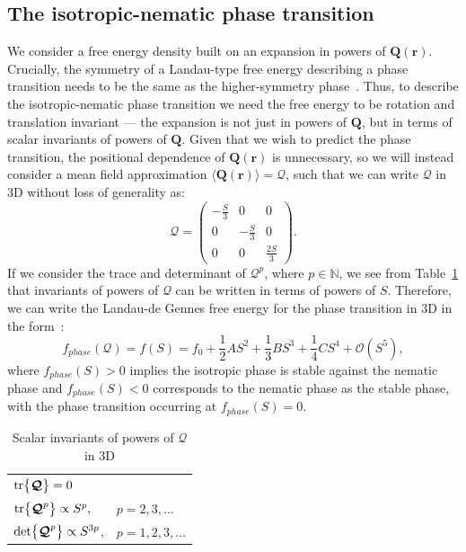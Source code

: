 \subsection{The isotropic-nematic phase transition}
We consider a free energy density built on an expansion in powers of $\mathbf{Q}(\mathbf{r})$.
Crucially, the symmetry of a Landau-type free energy describing a phase transition needs to be the same as the higher-symmetry phase~\cite{RN33,RN175}.
Thus, to describe the isotropic-nematic phase transition we need the free energy to be rotation and translation invariant --- the expansion is not just in powers of $\mathbf{Q}$, but in terms of scalar invariants of powers of $\mathbf{Q}$.
Given that we wish to predict the phase transition, the positional dependence of $\mathbf{Q}(\mathbf{r})$ is unnecessary, so we will instead consider a mean field approximation $\langle \mathbf{Q}(\mathbf{r}) \rangle = \bm{\mathcal{Q}}$, such that we can write $\bm{\mathcal{Q}}$ in 3D without loss of generality as:
\begin{equation}
  \bm{\mathcal{Q}} =
    \begin{pmatrix}
        -\frac{S}{3} & 0 & 0 \\
        0 & -\frac{S}{3} & 0 \\
        0 & 0 & \frac{2S}{3}
    \end{pmatrix}.
\end{equation}
If we consider the trace and determinant of $\bm{\mathcal{Q}}^p$, where $p \in \mathbb{N}$, we see from Table~\ref{t:2-powersQ} that invariants of powers of $\bm{\mathcal{Q}}$ can be written in terms of powers of $S$.
Therefore, we can write the Landau-de Gennes free energy for the phase transition in 3D in the form~\cite{RN33,RN175}:
\begin{equation}
  f_{phase}(\bm{\mathcal{Q}}) = f(S) = f_0 + \frac{1}{2}A S^2 + \frac{1}{3}B S^3 + \frac{1}{4}C S^4 + \mathcal{O} \left (S^5 \right ),\label{e:2-LdGTransGeneral}
\end{equation}
where $f_{phase}(S) > 0$ implies the isotropic phase is stable against the nematic phase and $f_{phase}(S) < 0$ corresponds to the nematic phase as the stable phase, with the phase transition occurring at $f_{phase}(S) = 0$.
\begin{table}[t]
  \centering
  \caption{Scalar invariants of powers of $\bm{\mathcal{Q}}$ in 3D}
  \label{t:2-powersQ}
  \begin{tabular}{|l l|}
    \hline
    $\textup{tr} \big \{ \bm{\mathcal{Q}} \big \} = 0$ & \\
    $\textup{tr} \big \{ \bm{\mathcal{Q}}^p \big \} \propto S^p,$ & $p = 2,3, \dots$ \\
    $\textup{det} \big \{ \bm{\mathcal{Q}}^p \big \} \propto S^{3p}$, & $p = 1,2,3,\dots$ \\
    \hline
  \end{tabular}
\end{table}
